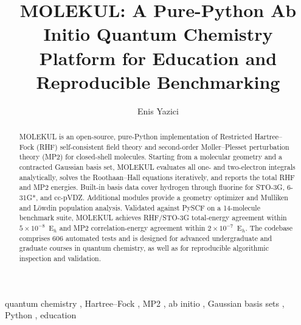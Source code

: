 \documentclass[1p,times]{elsarticle}
\begin{document}
\begin{frontmatter}

\title{MOLEKUL: A Pure-Python Ab Initio Quantum Chemistry Platform for
       Education and Reproducible Benchmarking}

\author{Enis Yazici}
\address{SRH University of Applied Sciences Heidelberg,\\
         School of Engineering and Architecture, Campus Heidelberg,\\
         Ludwig-Guttmann-Straße 6, 69123 Heidelberg, Germany}

\begin{abstract}
MOLEKUL is an open-source, pure-Python implementation of Restricted
Hartree--Fock (RHF) self-consistent field theory and second-order
M{\o}ller--Plesset perturbation theory (MP2) for closed-shell molecules.
Starting from a molecular geometry and a contracted Gaussian basis set, MOLEKUL
evaluates all one- and two-electron integrals analytically, solves the
Roothaan--Hall equations iteratively, and reports the total RHF and MP2
energies.
Built-in basis data cover hydrogen through fluorine for STO-3G, 6-31G*, and
cc-pVDZ.
Additional modules provide a geometry optimizer and Mulliken and L{\"o}wdin
population analysis.
Validated against PySCF on a 14-molecule benchmark suite, MOLEKUL achieves
RHF/STO-3G total-energy agreement within $5\times10^{-8}$~E$_h$ and MP2
correlation-energy agreement within $2\times10^{-7}$~E$_h$.
The codebase comprises 606 automated tests and is designed for advanced
undergraduate and graduate courses in quantum chemistry, as well as for
reproducible algorithmic inspection and validation.
\end{abstract}

\begin{keyword}
quantum chemistry \sep
Hartree--Fock \sep
MP2 \sep
ab initio \sep
Gaussian basis sets \sep
Python \sep
education
\end{keyword}

\end{frontmatter}
\end{document}
